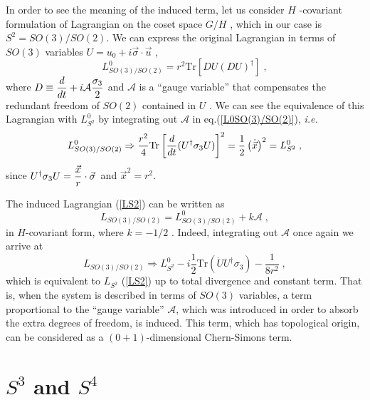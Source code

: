 \documentclass[12pt,a4paper]{article}
\begin{document}
In order to see the meaning of the induced term, let us consider $H$%
-covariant formulation of Lagrangian on the coset space $G/H$ , which in our
case is $S^{2}=SO(3)/SO(2)$. We can express the original Lagrangian in terms
of $SO(3)$ variables $U=u_{0}+i\vec{\sigma}\cdot \vec{u}$ , 
\begin{equation}
L_{SO(3)/SO(2)}^{0}={r}^{2}\mathrm{Tr}[DU(DU)^{\dagger }]\;,
\label{L0SO(3)/SO(2)}
\end{equation}
where $D\equiv \displaystyle\frac{d}{dt}+i\mathcal{A}\displaystyle\frac{%
\sigma _{3}}{2}$ and $\mathcal{A}$ is a ``gauge variable'' that compensates
the redundant freedom of $SO(2)$ contained in $U$ . We can see the
equivalence of this Lagrangian with $L_{S^{2}}^{0}$ by integrating out $%
\mathcal{A}$ in eq.(\ref{L0SO(3)/SO(2)}), \textit{i.e.} 
\begin{equation}
L_{SO(3)/SO(2)}^{0}\Rightarrow {\frac{r^{2}}{4}}\mathrm{Tr}\left[ {\frac{d}{%
dt}}(U^{\dagger }\sigma _{3}U)\right] ^{2}=\frac{1}{2}\left( \dot{\vec{x}}%
\right) ^{2}=L_{S^{2}}^{0}\;,
\end{equation}
since $U^{\dagger }\sigma _{3}U=\displaystyle\frac{\vec{x}}{r}\cdot \vec{%
\sigma}$\ and $\vec{x}^{2}=r^{2}$.

The induced Lagrangian (\ref{LS2}) can be written as 
\begin{equation}
L_{SO(3)/SO(2)}=L_{SO(3)/SO(2)}^{0}+k\mathcal{A}\;,
\end{equation}
in $H$-covariant form, where $k=-1/2$ . Indeed, integrating out $\mathcal{A}$
once again we arrive at 
\begin{equation}
L_{SO(3)/SO(2)}\Rightarrow L_{S^{2}}^{0}-i\frac{1}{2}\mathrm{Tr}(\dot{U}%
U^{\dagger }\sigma _{3})-\frac{1}{8r^{2}}\;,
\end{equation}
which is equivalent to $L_{S^{2}}$ (\ref{LS2}) up to total divergence and
constant term. That is, when the system is described in terms of $SO(3)$
variables, a term proportional to the ``gauge variable'' $\mathcal{A}$,
which was introduced in order to absorb the extra degrees of freedom, is
induced. This term, which has topological origin, can be considered as a $%
(0+1)$-dimensional Chern-Simons term.

\section{$S^{3}$ and $S^{4}$}
\end{document}

